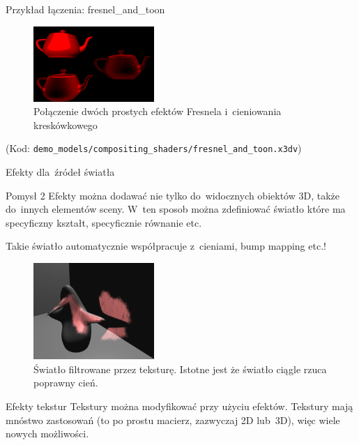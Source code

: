 \documentclass{beamer}
\begin{document}
\begin{frame}{Przykład łączenia: fresnel\_and\_toon}
\begin{figure}
  \centering
  \includegraphics[width=1.8in]{../fresnel_and_toon}
  \caption{Połączenie dwóch prostych efektów Fresnela i~cieniowania kreskówkowego}
\end{figure}

(Kod: \texttt{demo\_models/compositing\_shaders/fresnel\_and\_toon.x3dv})

\end{frame}

\begin{frame}{Efekty dla~źródeł światła}
\begin{block}{Pomysł 2}
Efekty można dodawać nie tylko do~widocznych obiektów 3D,
także do~innych elementów sceny. W~ten sposob można zdefiniować
światło które ma specyficzny kształt, specyficznie równanie etc.
\end{block}

Takie światło automatycznie współpracuje z~cieniami, bump mapping etc.!

\begin{figure}
  \centering
  \includegraphics[width=1.8in]{../fancy_light_spot_shape}
  \caption{Światło filtrowane przez teksturę. Istotne jest że światło ciągle rzuca poprawny cień.}
\end{figure}
\end{frame}

\begin{frame}{Efekty tekstur}
Tekstury można modyfikować przy użyciu efektów. Tekstury mają mnóstwo
zastosowań (to po prostu macierz, zazwyczaj 2D lub~3D), więc wiele nowych
możliwości.
\end{frame}
\end{document}
